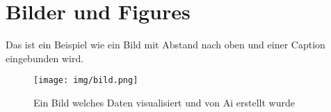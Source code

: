 \section{Bilder und Figures}
Das ist ein Beispiel wie ein Bild mit Abstand nach oben und einer Caption eingebunden wird.

\vspace{1cm}
\begin{figure}[H]
  \centering
  \texttt{[image: img/bild.png]}
  \caption{Ein Bild welches Daten visualisiert und von Ai erstellt wurde}
\end{figure}
